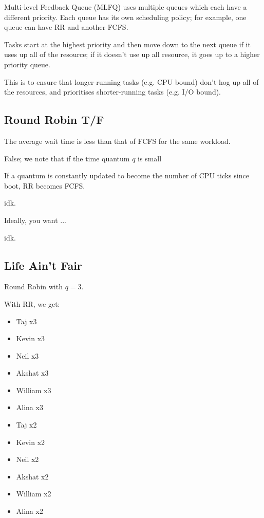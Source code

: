\documentclass[openany]{book}
\begin{document}
\begin{defn}
	Multi-level Feedback Queue (MLFQ) uses multiple queues which each have a different priority. Each queue has its own scheduling policy; for example, one queue can have RR and another FCFS.
	
	Tasks start at the highest priority and then move down to the next queue if it uses up all of the resource; if it doesn't use up all resource, it goes up to a higher priority queue.
	
	This is to ensure that longer-running tasks (e.g. CPU bound) don't hog up all of the resources, and prioritises shorter-running tasks (e.g. I/O bound).
\end{defn}

\subsection{Round Robin T/F}
\begin{hw}
	The average wait time is less than that of FCFS for the same workload.
\end{hw}
\begin{solution}
	False; we note that if the time quantum $q$ is small
\end{solution}

\begin{hw}
	If a quantum is constantly updated to become the number of CPU ticks since boot, RR becomes FCFS.
\end{hw}
\begin{solution}
	idk.
\end{solution}

\begin{hw}
	Ideally, you want ...
\end{hw}
\begin{solution}
	idk.
\end{solution}

\subsection{Life Ain't Fair}
\begin{hw}
	Round Robin with $q = 3$.
\end{hw}
\begin{solution}
	With RR, we get:
	\begin{itemize}
		\item Taj x3
		\item Kevin x3
		\item Neil x3
		\item Akshat x3
		\item William x3
		\item Alina x3
		\item Taj x2
		\item Kevin x2
		\item Neil x2
		\item Akshat x2
		\item William x2
		\item Alina x2
	\end{itemize}
\end{solution}
\end{document}
